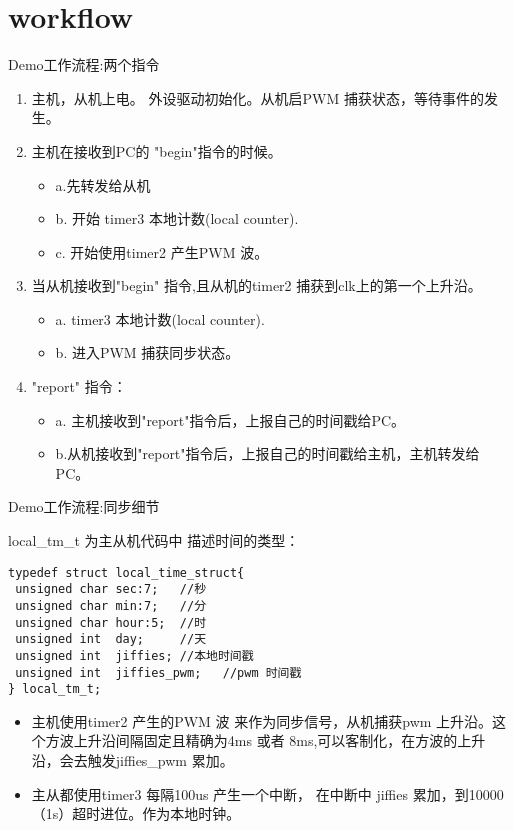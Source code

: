 \section{workflow}

\begin{frame}[fragile]{Demo工作流程:两个指令}

\begin{enumerate}
\item 主机，从机上电。 外设驱动初始化。从机启PWM 捕获状态，等待事件的发生。
\item 主机在接收到PC的 "begin"指令的时候。
  \begin{itemize}
    \item a.先转发给从机
    \item b. 开始 timer3 本地计数(local counter).
    \item c. 开始使用timer2 产生PWM 波。
  \end{itemize}
\item 当从机接收到"begin" 指令,且从机的timer2 捕获到clk上的第一个上升沿。
  \begin{itemize}
    \item a.  timer3 本地计数(local counter).
    \item b. 进入PWM 捕获同步状态。
  \end{itemize}
\item "report" 指令：
\begin{itemize}
  \item a. 主机接收到"report"指令后，上报自己的时间戳给PC。
  \item b.从机接收到"report"指令后，上报自己的时间戳给主机，主机转发给PC。
\end{itemize}

\end{enumerate}


\end{frame}




\begin{frame}[fragile]{Demo工作流程:同步细节}

local\_tm\_t 为主从机代码中 描述时间的类型：
\begin{lstlisting}
typedef struct local_time_struct{
 unsigned char sec:7;   //秒
 unsigned char min:7;   //分
 unsigned char hour:5;  //时
 unsigned int  day;     //天
 unsigned int  jiffies; //本地时间戳
 unsigned int  jiffies_pwm;   //pwm 时间戳
} local_tm_t;
\end{lstlisting}


\begin{itemize}
  \item 主机使用timer2 产生的PWM 波 来作为同步信号，从机捕获pwm 上升沿。这个方波上升沿间隔固定且精确为4ms 或者 8ms,可以客制化，在方波的上升沿，会去触发jiffies\_pwm 累加。
  \item 主从都使用timer3 每隔100us 产生一个中断，  在中断中 jiffies 累加，到10000（1s）超时进位。作为本地时钟。
\end{itemize}

\end{frame}




